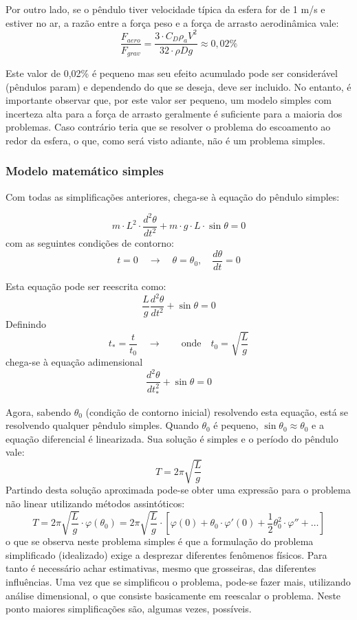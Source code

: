\documentclass[article,12pt,oneside,a4paper,english,brazil,sumario=tradicional]{abntex2}
\newcommand{\lra}{\ensuremath{\longrightarrow}}
\newcommand{\qrq}{\ensuremath{\quad\lra\quad}}
\begin{document}
Por outro lado, se o pêndulo tiver velocidade típica da esfera for de 1 m/s e estiver no ar, a razão entre a força peso e a força de arrasto aerodinâmica vale:
\[
\frac{F_{aero}}{F_{grav}} = \frac{3\cdot C_D \rho_a V^2}{32\cdot\rho D g} \approx 0,02\%
\]

Este valor de 0,02\% é pequeno mas seu efeito acumulado pode ser considerável (pêndulos param) e dependendo do que se deseja, deve ser incluido. No entanto, é importante observar que, por este valor ser pequeno, um modelo simples com incerteza alta para a força de arrasto geralmente é suficiente para a maioria dos problemas. Caso contrário teria que se resolver o problema do escoamento ao redor da esfera, o que, como será visto adiante, não é um problema simples.

\subsubsection{Modelo matemático simples}
Com todas as simplificações anteriores, chega-se à equação do pêndulo simples:

\[
m\cdot L^2\cdot\frac{d^2\theta}{dt^2} + m\cdot g\cdot L\cdot \sin\theta = 0
\]
com as seguintes condições de contorno:
\[
t = 0 \qrq \theta=\theta_0, \quad\frac{d\theta}{dt} = 0
\]

Esta equação pode ser reescrita como:
\[
\frac{L}{g}\frac{d^2\theta}{dt^2} + \sin\theta = 0 
\]
Definindo 
\[
t_* = \frac{t}{t_0}\qrq \quad\text{onde}\quad t_0 = \sqrt{\frac{L}{g}}
\]
chega-se à equação adimensional
\[
\frac{d^2\theta}{dt_*^2} + \sin\theta = 0 
\]

Agora, sabendo $\theta_0$ (condição de contorno inicial) resolvendo esta equação, está se resolvendo qualquer pêndulo simples. Quando $\theta_0$ é pequeno, $\sin\theta_0\approx\theta_0$ e a equação diferencial é linearizada. Sua solução é simples e o período do pêndulo vale:
\[
T = 2\pi\sqrt{\frac{L}{g}}
\]
Partindo desta solução aproximada pode-se obter uma expressão para o problema não linear utilizando métodos assintóticos:
\[
T = 2\pi\sqrt{\frac{L}{g}}\cdot\varphi(\theta_0) = 2\pi \sqrt{\frac{L}{g}} \cdot\left[\varphi(0) + \theta_0\cdot\varphi'(0) +
\frac{1}{2}\theta_0^2\cdot\varphi'' + \ldots\right]
\]
o que se observa neste problema simples é que a formulação do problema simplificado (idealizado) exige a desprezar diferentes fenômenos físicos. Para tanto é necessário achar estimativas, mesmo que grosseiras, das diferentes influências. Uma vez que se simplificou o problema, pode-se fazer mais, utilizando análise dimensional, o que consiste basicamente em reescalar o problema. Neste ponto maiores simplificações são, algumas vezes, possíveis.
\end{document}
